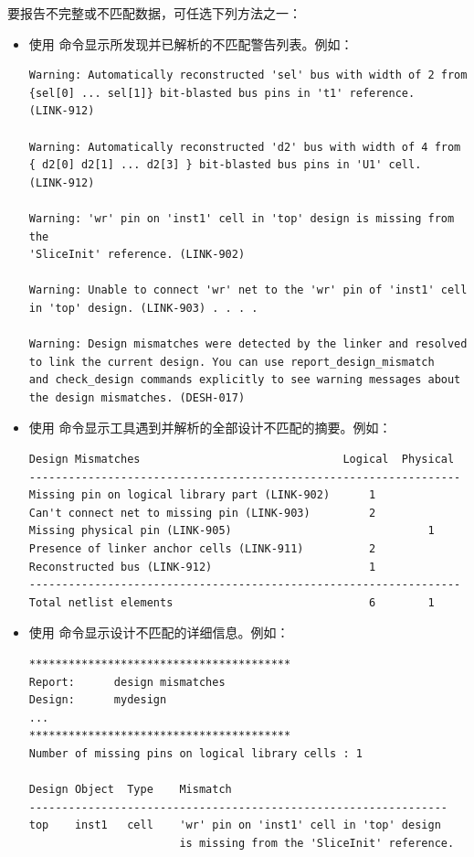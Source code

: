 要报告不完整或不匹配数据，可任选下列方法之一：
\begin{itemize}
  \item 使用  命令显示所发现并已解析的不匹配警告列表。例如：
\begin{lstlisting}
Warning: Automatically reconstructed 'sel' bus with width of 2 from
{sel[0] ... sel[1]} bit-blasted bus pins in 't1' reference.
(LINK-912)

Warning: Automatically reconstructed 'd2' bus with width of 4 from
{ d2[0] d2[1] ... d2[3] } bit-blasted bus pins in 'U1' cell.
(LINK-912)

Warning: 'wr' pin on 'inst1' cell in 'top' design is missing from the
'SliceInit' reference. (LINK-902)

Warning: Unable to connect 'wr' net to the 'wr' pin of 'inst1' cell
in 'top' design. (LINK-903) . . . .

Warning: Design mismatches were detected by the linker and resolved
to link the current design. You can use report_design_mismatch
and check_design commands explicitly to see warning messages about
the design mismatches. (DESH-017)
\end{lstlisting}

  \item 使用  命令显示工具遇到并解析的全部设计不匹配的摘要。例如：
\begin{lstlisting}
Design Mismatches                               Logical  Physical
------------------------------------------------------------------
Missing pin on logical library part (LINK-902)      1
Can't connect net to missing pin (LINK-903)         2
Missing physical pin (LINK-905)                              1
Presence of linker anchor cells (LINK-911)          2
Reconstructed bus (LINK-912)                        1
------------------------------------------------------------------
Total netlist elements                              6        1
\end{lstlisting}

  \item 使用  命令显示设计不匹配的详细信息。例如：
\begin{lstlisting}
****************************************
Report:      design mismatches
Design:      mydesign
...
****************************************
Number of missing pins on logical library cells : 1

Design Object  Type    Mismatch
----------------------------------------------------------------
top    inst1   cell    'wr' pin on 'inst1' cell in 'top' design
                       is missing from the 'SliceInit' reference.


\end{lstlisting}
\end{itemize}
